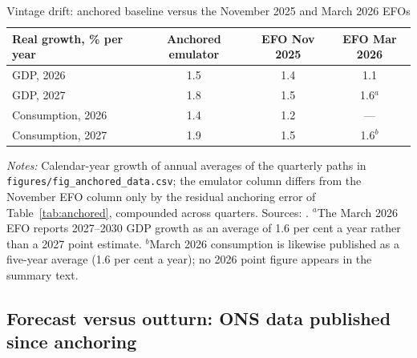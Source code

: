 \begin{table}[ht]
\centering
\caption{Vintage drift: anchored baseline versus the November 2025 and March 2026 EFOs}
\label{tab:vintage}
\small
\setlength{\tabcolsep}{5pt}
\begin{tabular}{lccc}
\toprule
Real growth, \% per year & Anchored emulator & EFO Nov 2025 & EFO Mar 2026 \\
\midrule
GDP, 2026 & 1.5 & 1.4 & 1.1 \\
GDP, 2027 & 1.8 & 1.5 & 1.6$^{a}$ \\
Consumption, 2026 & 1.4 & 1.2 & --- \\
Consumption, 2027 & 1.9 & 1.5 & 1.6$^{b}$ \\
\bottomrule
\end{tabular}

\medskip
\parbox{0.92\textwidth}{\footnotesize \emph{Notes:} Calendar-year growth of annual averages of the quarterly paths in \texttt{figures/fig\_anchored\_data.csv}; the emulator column differs from the November EFO column only by the residual anchoring error of Table~\ref{tab:anchored}, compounded across quarters. Sources: \citet{obr2025efo, obr2026efo}. $^{a}$The March 2026 EFO reports 2027--2030 GDP growth as an average of 1.6 per cent a year rather than a 2027 point estimate. $^{b}$March 2026 consumption is likewise published as a five-year average (1.6 per cent a year); no 2026 point figure appears in the summary text.}
\end{table}

\subsection{Forecast versus outturn: ONS data published since anchoring}
\label{sec:outturn}

